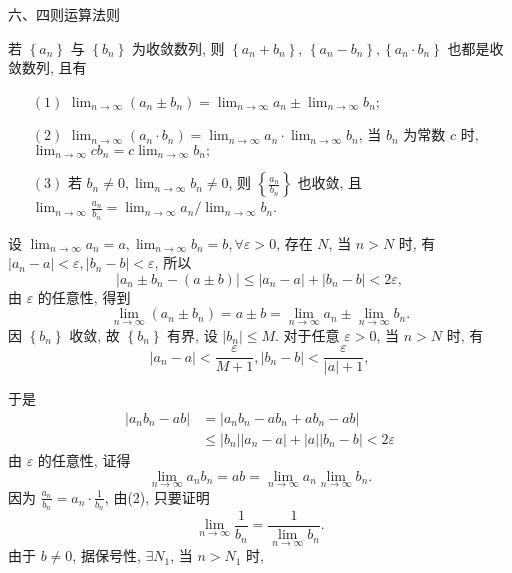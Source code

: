 \documentclass [t,12pt,mathserif] {beamer}
\begin{document}
\begin{frame}{   六、四则运算法则}%
\begin{thm}
若 $\left\{a_n\right\}$ 与 $\left\{b_n\right\}$ 为收敛数列, 则 $\left\{a_n+b_n\right\}$, $\left\{a_n-b_n\right\},\left\{a_n \cdot b_n\right\}$ 也都是收敛数列, 且有
\begin{enumerate}
    \item[{\color{black}$(1)$}] $\lim _{n \rightarrow \infty}\left(a_n \pm b_n\right)=\lim _{n \rightarrow \infty} a_n \pm \lim _{n \rightarrow \infty} b_n$;
    \item[{\color{black}$(2)$}]  $\lim _{n \rightarrow \infty}\left(a_n \cdot b_n\right)=\lim _{n \rightarrow \infty} a_n \cdot \lim _{n \rightarrow \infty} b_n$, 当 $b_n$ 为常数 $c$ 时, $\lim _{n \rightarrow \infty} c b_n=c \lim _{n \rightarrow \infty} b_n;$
    \item[{\color{black}$(3)$}] 若 $b_n \neq 0, \lim _{n \rightarrow \infty} b_n \neq 0$, 则 $\left\{\frac{a_n}{b_n}\right\}$ 也收敛, 且 $\lim _{n \rightarrow \infty} \frac{a_n}{b_n}=\lim _{n \rightarrow \infty} a_n / \lim _{n \rightarrow \infty} b_n$. 
\end{enumerate}

\end{thm}

\end{frame}


\begin{frame}{}%
\zheng {} 设 $\lim _{n \rightarrow \infty} a_n=a, \lim _{n \rightarrow \infty} b_n=b, \forall \varepsilon>0$, 存在 $N$, 当 $n>N$ 时, 有 $\left|a_n-a\right|<\varepsilon,\left|b_n-b\right|<\varepsilon$, 所以
$$
\left|a_n \pm b_n-(a \pm b)\right| \leq\left|a_n-a\right|+\left|b_n-b\right|<2 \varepsilon,
$$
由 $\varepsilon$ 的任意性, 得到
$$
\lim _{n \rightarrow \infty}\left(a_n \pm b_n\right)=a \pm b=\lim _{n \rightarrow \infty} a_n \pm \lim _{n \rightarrow \infty} b_n .
$$
\zheng {}  因 $\left\{b_n\right\}$ 收敛, 故 $\left\{b_n\right\}$ 有界, 设 $\left|b_n\right| \leq M$.
对于任意 $\varepsilon>0$, 当 $n>N$ 时, 有
$$
\left|a_n-a\right|<\frac{\varepsilon}{M+1},\left|b_n-b\right|<\frac{\varepsilon}{|a|+1},
$$
    
\end{frame}


\begin{frame}{}%
  于是
$$
\begin{aligned}
\left|a_n b_n-a b\right| & =\left|a_n b_n-a b_n+a b_n-a b\right| \\
& \leq\left|b_n\right|\left|a_n-a\right|+|a|\left|b_n-b\right|<2 \varepsilon
\end{aligned}
$$
由 $\varepsilon$ 的任意性, 证得
$$
\lim _{n \rightarrow \infty} a_n b_n=a b=\lim _{n \rightarrow \infty} a_n \lim _{n \rightarrow \infty} b_n .
$$
\zheng {} 因为 $\frac{a_n}{b_n}=a_n \cdot \frac{1}{b_n}$, 由(2), 只要证明
$$
\lim _{n \rightarrow \infty} \frac{1}{b_n}=\frac{1}{\lim\limits_{n \rightarrow \infty} b_n} .
$$
由于 $b \neq 0$, 据保号性, $\exists N_1$, 当 $n>N_1$ 时,  
\end{frame}
\end{document}
